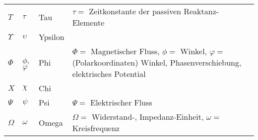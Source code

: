 \begin{tabular}{|l|l|l|m{8.8cm}|}
	$T$					& $\tau$					& Tau 						& $\tau =$ Zeitkonstante der passiven Reaktanz-Elemente \\[3pt]
	$\Upsilon$			& $\upsilon$				& Ypsilon 					&  \\[3pt]
	$\Phi$				& $\phi$, $\varphi$			& Phi 						& $\Phi =$ Magnetischer Fluss, $\phi =$ Winkel, $\varphi =$ (Polarkoordinaten) Winkel, Phasenverschiebung, elektrisches Potential \\[3pt]
	$X$					& $\chi$					& Chi 						&  \\[3pt]
	$\Psi$				& $\psi$					& Psi 						& $\Psi =$ Elektrischer Fluss \\[3pt]
	$\Omega$			& $\omega$					& Omega 					& $\Omega =$ Widerstand-, Impedanz-Einheit, $\omega =$ Kreisfrequenz \\[3pt]
	\hline
\end{tabular}